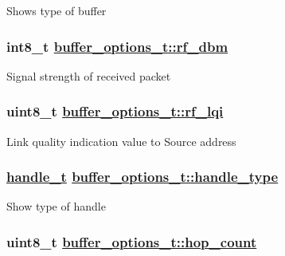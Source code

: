 Shows type of buffer \hypertarget{structbuffer__options__t_7ab085df01d06758397a0a20ae7e456e}{
\subsubsection[rf\_\-dbm]{\setlength{\rightskip}{0pt plus 5cm}int8\_\-t \hyperlink{structbuffer__options__t_7ab085df01d06758397a0a20ae7e456e}{buffer\_\-options\_\-t::rf\_\-dbm}}}
\label{structbuffer__options__t_7ab085df01d06758397a0a20ae7e456e}


Signal strength of received packet \hypertarget{structbuffer__options__t_2aec4493d07fae7bb2801231085d1bcb}{
\subsubsection[rf\_\-lqi]{\setlength{\rightskip}{0pt plus 5cm}uint8\_\-t \hyperlink{structbuffer__options__t_2aec4493d07fae7bb2801231085d1bcb}{buffer\_\-options\_\-t::rf\_\-lqi}}}
\label{structbuffer__options__t_2aec4493d07fae7bb2801231085d1bcb}


Link quality indication value to Source address \hypertarget{structbuffer__options__t_8b4126f357282f246c62623a7c04a0d5}{
\subsubsection[handle\_\-type]{\setlength{\rightskip}{0pt plus 5cm}\hyperlink{buffer_8h_03eee9524252e108b2762c560b60da9b}{handle\_\-t} \hyperlink{structbuffer__options__t_8b4126f357282f246c62623a7c04a0d5}{buffer\_\-options\_\-t::handle\_\-type}}}
\label{structbuffer__options__t_8b4126f357282f246c62623a7c04a0d5}


Show type of handle \hypertarget{structbuffer__options__t_f6af386458431a08a8b738dd3836a3c6}{
\subsubsection[hop\_\-count]{\setlength{\rightskip}{0pt plus 5cm}uint8\_\-t \hyperlink{structbuffer__options__t_f6af386458431a08a8b738dd3836a3c6}{buffer\_\-options\_\-t::hop\_\-count}}}
\label{structbuffer__options__t_f6af386458431a08a8b738dd3836a3c6}


